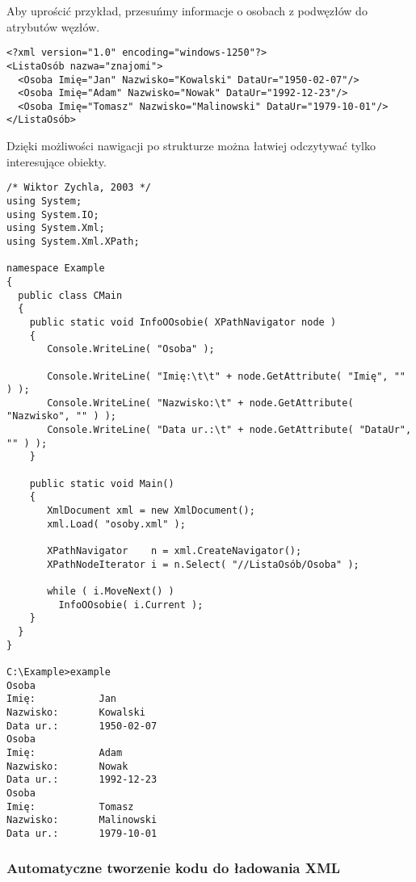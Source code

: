 Aby uprościć przykład, przesuńmy informacje o osobach z podwęzłów do atrybutów węzłów.

\begin{scriptsize}
\begin{verbatim}
<?xml version="1.0" encoding="windows-1250"?>
<ListaOsób nazwa="znajomi">
  <Osoba Imię="Jan" Nazwisko="Kowalski" DataUr="1950-02-07"/>
  <Osoba Imię="Adam" Nazwisko="Nowak" DataUr="1992-12-23"/>
  <Osoba Imię="Tomasz" Nazwisko="Malinowski" DataUr="1979-10-01"/>
</ListaOsób>
\end{verbatim}
\end{scriptsize}

Dzięki możliwości nawigacji po strukturze można łatwiej odczytywać tylko interesujące obiekty.

\begin{scriptsize}
\begin{verbatim}
/* Wiktor Zychla, 2003 */
using System;
using System.IO;
using System.Xml;
using System.Xml.XPath;

namespace Example
{
  public class CMain
  {   
    public static void InfoOOsobie( XPathNavigator node )
    {
       Console.WriteLine( "Osoba" );

       Console.WriteLine( "Imię:\t\t" + node.GetAttribute( "Imię", "" ) );
       Console.WriteLine( "Nazwisko:\t" + node.GetAttribute( "Nazwisko", "" ) );
       Console.WriteLine( "Data ur.:\t" + node.GetAttribute( "DataUr", "" ) );
    }

    public static void Main()
    {
       XmlDocument xml = new XmlDocument();
       xml.Load( "osoby.xml" );

       XPathNavigator    n = xml.CreateNavigator();
       XPathNodeIterator i = n.Select( "//ListaOsób/Osoba" );

       while ( i.MoveNext() )
         InfoOOsobie( i.Current );
    }
  }
}

C:\Example>example
Osoba
Imię:           Jan
Nazwisko:       Kowalski
Data ur.:       1950-02-07
Osoba
Imię:           Adam
Nazwisko:       Nowak
Data ur.:       1992-12-23
Osoba
Imię:           Tomasz
Nazwisko:       Malinowski
Data ur.:       1979-10-01
\end{verbatim}
\end{scriptsize}

\subsubsection{Automatyczne tworzenie kodu do ładowania XML}

